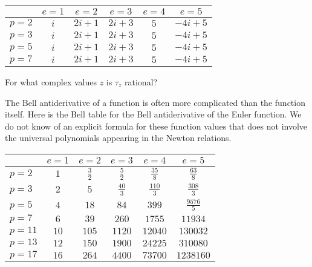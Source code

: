 \documentclass[a4paper]{article}
\begin{document}
\begin{example}
\begin{center}
\begin{tabular}{| l | | c | c | c | c | c |}
\hline
& $e = 1$ & $e = 2$ & $e = 3$ & $e = 4$ & $e = 5$\\
\hline
\hline
$p = 2$ & $i$ & $2 i + 1$ & $2 i + 3$ & $5$ & $-4 i + 5$ \\
\hline
$p = 3$ & $i$ & $2 i + 1$ & $2 i + 3$ & $5$ & $-4 i + 5$ \\
\hline
$p = 5$ & $i$ & $2 i + 1$ & $2 i + 3$ & $5$ & $-4 i + 5$ \\
\hline
$p = 7$ & $i$ & $2 i + 1$ & $2 i + 3$ & $5$ & $-4 i + 5$ \\
\hline
\end{tabular}
\end{center}
\end{example}

\begin{exercise}
For what complex values $z$ is $\tau_z$ rational?
\end{exercise}

\begin{example}
The Bell antiderivative of a function is often more complicated than the function itself. Here is the Bell table for the Bell antiderivative of the Euler function. We do not know of an explicit formula for these function values that does not involve the universal polynomials appearing in the Newton relations.
\vskip10pt
\begin{center}

\begin{tabular}{| l | | c | c | c | c | c |}
\hline
& $e = 1$ & $e = 2$ & $e = 3$ & $e = 4$ & $e = 5$\\
\hline
\hline
$p = 2$ & $1$ & $\frac{3}{2}$ & $\frac{5}{2}$ & $\frac{35}{8}$ & $\frac{63}{8}$ \\
\hline
$p = 3$ & $2$ & $5$ & $\frac{40}{3}$ & $\frac{110}{3}$ & $\frac{308}{3}$ \\
\hline
$p = 5$ & $4$ & $18$ & $84$ & $399$ & $\frac{9576}{5}$ \\
\hline
$p = 7$ & $6$ & $39$ & $260$ & $1755$ & $11934$ \\
\hline
$p = 11$ & $10$ & $105$ & $1120$ & $12040$ & $130032$ \\
\hline
$p = 13$ & $12$ & $150$ & $1900$ & $24225$ & $310080$ \\
\hline
$p = 17$ & $16$ & $264$ & $4400$ & $73700$ & $1238160$ \\
\hline
\end{tabular}
\end{center}

\end{example}
\end{document}
